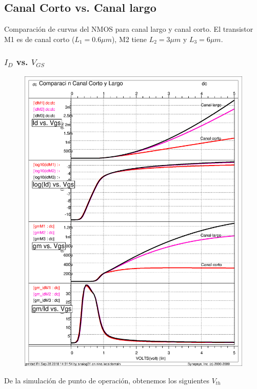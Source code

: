 
\everymath{\displaystyle} %


  
\subsection{Canal Corto vs. Canal largo}
Comparación de curvas del NMOS para canal largo y canal corto. El transistor M1 es de canal corto ($L_1=0.6\mu m$), M2 tiene $L_2=3\mu m$ y $L_3=6\mu m$.
\subsubsection{$I_D$ vs. $V_{GS}$}
\vspace{0.3cm}
\begin{figure}
\includegraphics[scale=0.6, angle=0]{images/todas}
\label{fig:ids_vgs}
\end{figure}
De la simulación de punto de operación, obtenemos los siguientes $V_{th}$ 

